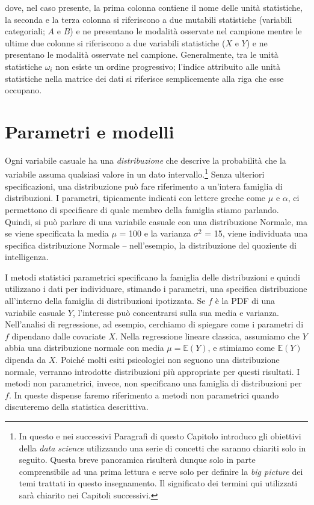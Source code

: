 \documentclass[
]{book}
\theoremstyle{definition}
\theoremstyle{definition}
\theoremstyle{definition}
\theoremstyle{definition}
\theoremstyle{remark}
\begin{document}
dove, nel caso presente, la prima colonna contiene il
nome delle unità statistiche, la seconda e la terza colonna si
riferiscono a due mutabili statistiche (variabili categoriali; \(A\) e
\(B\)) e ne presentano le modalità osservate nel campione mentre le ultime
due colonne si riferiscono a due variabili statistiche (\(X\) e \(Y\)) e ne
presentano le modalità osservate nel campione. Generalmente, tra le
unità statistiche \(\omega_i\) non esiste un ordine progressivo; l'indice
attribuito alle unità statistiche nella matrice dei dati si riferisce
semplicemente alla riga che esse occupano.

\hypertarget{parametri-e-modelli}{%
\section{Parametri e modelli}\label{parametri-e-modelli}}

Ogni variabile casuale ha una \emph{distribuzione} che descrive la probabilità che la variabile assuma qualsiasi valore in un dato intervallo.\footnote{In questo e nei successivi Paragrafi di questo Capitolo introduco gli obiettivi della \emph{data science} utilizzando una serie di concetti che saranno chiariti solo in seguito. Questa breve panoramica risulterà dunque solo in parte comprensibile ad una prima lettura e serve solo per definire la \emph{big picture} dei temi trattati in questo insegnamento. Il significato dei termini qui utilizzati sarà chiarito nei Capitoli successivi.} Senza ulteriori specificazioni, una distribuzione può fare riferimento a un'intera famiglia di distribuzioni. I parametri, tipicamente indicati con lettere greche come \(\mu\) e \(\alpha\), ci permettono di specificare di quale membro della famiglia stiamo parlando. Quindi, si può parlare di una variabile casuale con una distribuzione Normale, ma se viene specificata la media \(\mu\) = 100 e la varianza \(\sigma^2\) = 15, viene individuata una specifica distribuzione Normale -- nell'esempio, la distribuzione del quoziente di intelligenza.

I metodi statistici parametrici specificano la famiglia delle distribuzioni e quindi utilizzano i dati per individuare, stimando i parametri, una specifica distribuzione all'interno della famiglia di distribuzioni ipotizzata. Se \(f\) è la PDF di una variabile casuale \(Y\), l'interesse può concentrarsi sulla sua media e varianza. Nell'analisi di regressione, ad esempio, cerchiamo di spiegare come i parametri di \(f\) dipendano dalle covariate \(X\). Nella regressione lineare classica, assumiamo che \(Y\) abbia una distribuzione normale con media \(\mu = \mathbb{E}(Y)\), e stimiamo come \(\mathbb{E}(Y)\) dipenda da \(X\). Poiché molti esiti psicologici non seguono una distribuzione normale, verranno introdotte distribuzioni più appropriate per questi risultati. I metodi non parametrici, invece, non specificano una famiglia di distribuzioni per \(f\). In queste dispense faremo riferimento a metodi non parametrici quando discuteremo della statistica descrittiva.
\end{document}
